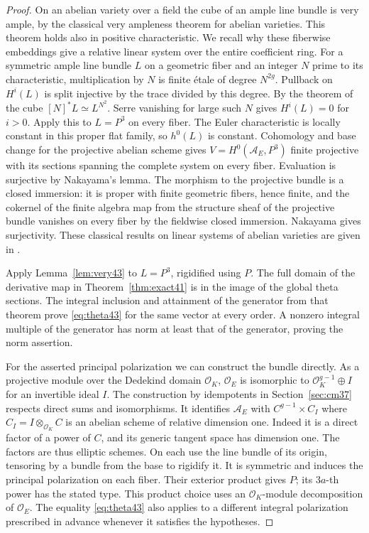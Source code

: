 \documentclass[a4paper,11pt]{article}
\theoremstyle{definition}
\theoremstyle{remark}
\numberwithin{equation}{section}
\newcommand{\OO}{\mathcal O}
\begin{document}
\begin{proof}
On an abelian variety over a field the cube of an ample line bundle is very ample, by the classical very ampleness theorem for abelian varieties. This theorem holds also in positive characteristic. We recall why these fiberwise embeddings give a relative linear system over the entire coefficient ring. For a symmetric ample line bundle \(L\) on a geometric fiber and an integer \(N\) prime to its characteristic, multiplication by \(N\) is finite \'etale of degree \(N^{2g}\). Pullback on \(H^i(L)\) is split injective by the trace divided by this degree. By the theorem of the cube \([N]^*L\simeq L^{N^2}\). Serre vanishing for large such \(N\) gives \(H^i(L)=0\) for \(i>0\). Apply this to \(L=P^3\) on every fiber. The Euler characteristic is locally constant in this proper flat family, so \(h^0(L)\) is constant. Cohomology and base change for the projective abelian scheme gives \(V=H^0(\mathcal A_E,P^3)\) finite projective with its sections spanning the complete system on every fiber. Evaluation is surjective by Nakayama's lemma. The morphism to the projective bundle is a closed immersion: it is proper with finite geometric fibers, hence finite, and the cokernel of the finite algebra map from the structure sheaf of the projective bundle vanishes on every fiber by the fieldwise closed immersion. Nakayama gives surjectivity. These classical results on linear systems of abelian varieties are given in \cite{XIII-X-IV-av43}.

Apply Lemma~\ref{lem:very43} to \(L=P^3\), rigidified using \(P\). The full domain of the derivative map in Theorem~\ref{thm:exact41} is in the image of the global theta sections. The integral inclusion and attainment of the generator from that theorem prove \eqref{eq:theta43} for the same vector at every order. A nonzero integral multiple of the generator has norm at least that of the generator, proving the norm assertion.

For the asserted principal polarization we can construct the bundle directly. As a projective module over the Dedekind domain \(\OO_K\), \(\OO_E\) is isomorphic to \(\OO_K^{g-1}\oplus I\) for an invertible ideal \(I\). The construction by idempotents in Section~\ref{sec:cm37} respects direct sums and isomorphisms. It identifies \(\mathcal A_E\) with \(C^{g-1}\times C_I\) where \(C_I=I\otimes_{\OO_K} C\) is an abelian scheme of relative dimension one. Indeed it is a direct factor of a power of \(C\), and its generic tangent space has dimension one. The factors are thus elliptic schemes. On each use the line bundle of its origin, tensoring by a bundle from the base to rigidify it. It is symmetric and induces the principal polarization on each fiber. Their exterior product gives \(P\); its \(3a\)-th power has the stated type. This product choice uses an \(\OO_K\)-module decomposition of \(\OO_E\). The equality \eqref{eq:theta43} also applies to a different integral polarization prescribed in advance whenever it satisfies the hypotheses.
\end{proof}
\end{document}
